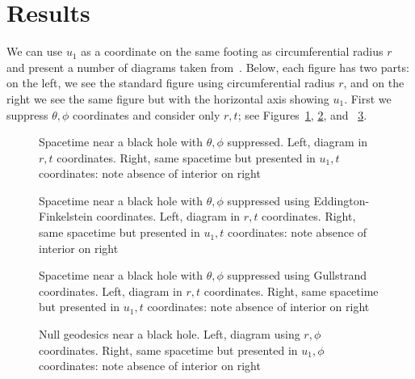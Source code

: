 \documentclass{article}
\begin{document}
\section{Results}

We can use $u_1$ as a coordinate on the same footing as
circumferential radius $r$ and present a number of diagrams taken
from~\citep{hankin2020}.  Below, each figure has two parts: on the
left, we see the standard figure using circumferential radius $r$, and
on the right we see the same figure but with the horizontal axis
showing $u_1$.  First we suppress $\theta,\phi$ coordinates and
consider only $r,t$; see Figures~\ref{schwarzschild}, \ref{eddington},
and ~\ref{gullstrand}.

\begin{figure}%
    \centering
    \caption{Spacetime near a black hole with $\theta,\phi$
      suppressed.  Left, diagram in $r,t$ coordinates.  Right, same
      spacetime but presented in $u_1,t$ coordinates: note absence of interior on right}
    \label{schwarzschild}%
\end{figure}

\begin{figure}%
    \centering
    \caption{Spacetime near a black hole with $\theta,\phi$ suppressed
      using Eddington-Finkelstein coordinates.  Left, diagram in $r,t$
      coordinates.  Right, same spacetime but presented in $u_1,t$
      coordinates: note absence of interior on right}
    \label{eddington}%
\end{figure}

\begin{figure}%
    \centering
    \caption{Spacetime near a black hole with $\theta,\phi$ suppressed
      using Gullstrand coordinates.  Left, diagram in $r,t$
      coordinates.  Right, same spacetime but presented in $u_1,t$
      coordinates: note absence of interior on right}
    \label{gullstrand}%
\end{figure}

\begin{figure}%
    \centering
    \caption{Null geodesics near a black hole.  Left, diagram using $r,\phi$
      coordinates.  Right, same spacetime but presented in $u_1,\phi$
      coordinates: note absence of interior on right}
    \label{light_2}%
\end{figure}
\end{document}
